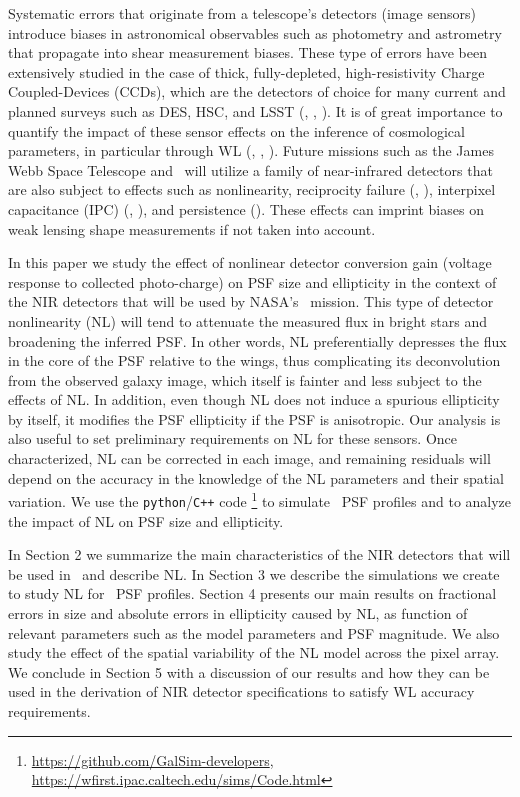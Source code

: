 \documentclass[11pt,preprint,flushrt]{aastex}
\begin{document}
Systematic errors that originate from a telescope's detectors (image sensors) introduce biases in astronomical observables such as photometry and astrometry that propagate into shear measurement biases. These type of errors have been extensively studied in the case of thick, fully-depleted, high-resistivity Charge Coupled-Devices (CCDs), which are the detectors of choice for many current and planned surveys such as DES, HSC, and LSST (\citealt{stubbs14}, \citealt{plazas14}, \citealt{gruen15}). It is of great importance to quantify the impact of these sensor effects on the inference of cosmological parameters, in particular through WL (\citealt{jarvis14}, \citealt{mandelbaum14b}, \citealt{meyers14}). Future missions such as the James Webb Space Telescope and \wfa\ will utilize a family of near-infrared detectors that are also subject to effects such as nonlinearity, reciprocity failure (\citealt{bohlin05}, \citealt{biesiadzinski11}), interpixel capacitance (IPC) (\citealt{mccullough08}, \citealt{kannawadi15}), and persistence (\citealt{smith08}). These effects can imprint biases on weak lensing shape measurements if not taken into account. 

In this paper we study the effect of nonlinear detector conversion gain (voltage response to collected photo-charge) on PSF size and ellipticity in the context of the NIR detectors that will be used by NASA's \wf\ mission. This type of detector nonlinearity (NL) will tend to attenuate the measured flux in bright stars and broadening the inferred PSF. In other words, NL preferentially depresses the flux in the core of the PSF relative to the wings, thus complicating its deconvolution from the observed galaxy image, which itself is fainter and less subject to the effects of NL. In addition, even though NL does not induce a spurious ellipticity by itself, it modifies the PSF ellipticity if the PSF is anisotropic. Our analysis is also useful to set preliminary requirements on NL for these sensors. Once characterized, NL can be corrected in each image, and remaining residuals will depend on the accuracy in the knowledge of the NL parameters and their spatial variation. We use the {\tt{python}}/{\tt{C++}} code \gs\footnote{\url{https://github.com/GalSim-developers}, \url{https://wfirst.ipac.caltech.edu/sims/Code.html}} \citep{rowe15} to simulate \wfa\ PSF profiles and to analyze the impact of NL on PSF size and ellipticity. 

In Section 2 we summarize the main characteristics of the NIR detectors that will be used in \wfa\, and describe NL. In Section 3 we describe the simulations we create to study NL for \wfa\ PSF profiles. Section 4 presents our main results on fractional errors in size and absolute errors in ellipticity caused by NL, as function of relevant parameters such as the model parameters and PSF magnitude. We also study the effect of the spatial variability of the NL model across the pixel array. We conclude in Section 5 with a discussion of our results and how they can be used in the derivation of NIR detector specifications to satisfy WL accuracy requirements.  
\end{document}
